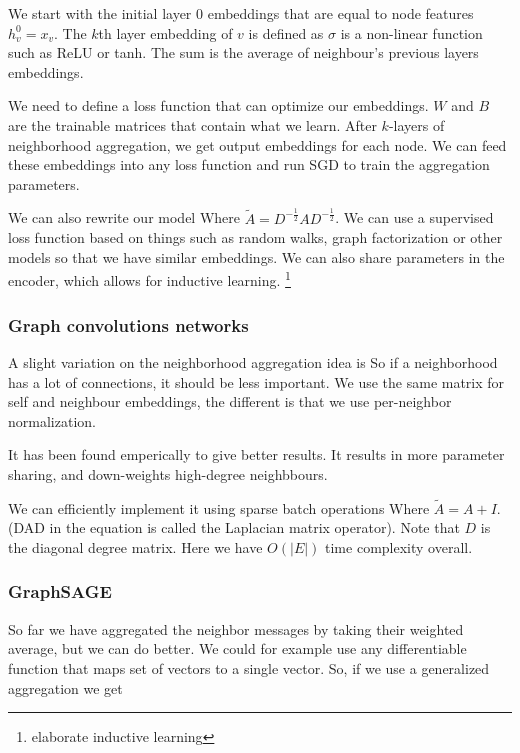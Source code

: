     We start with the initial layer $0$ embeddings that are equal to node features $h_v^0 = x_v$. The $k$th layer embedding of $v$ is defined as 
    $\sigma$ is a non-linear function such as ReLU or tanh. The sum is the average of neighbour's previous layers embeddings. 
    
    We need to define a loss function that can optimize our embeddings. $W$ and $B$ are the trainable matrices that contain what we learn. After $k$-layers of neighborhood aggregation, we get output embeddings for each node. We can feed these embeddings into any loss function and run SGD to train the aggregation parameters. 
    
    We can also rewrite our model
    Where $\tilde{A} = D^{-\frac{1}{2}}AD^{-\frac{1}{2}}$. We can use a supervised loss function based on things such as random walks, graph factorization or other models so that we have similar embeddings. We can also share parameters in the encoder, which allows for inductive learning. \footnote{elaborate inductive learning}
    
\subsubsection{Graph convolutions networks}
    A slight variation on the neighborhood aggregation idea is 
    So if a neighborhood has a lot of connections, it should be less important. We use the same matrix for self and neighbour embeddings, the different is that we use per-neighbor normalization.
    
    It has been found emperically to give better results. It results in more parameter sharing, and down-weights high-degree neighbbours. 
    
    We can efficiently implement it using sparse batch operations
    Where $\tilde{A} = A + I$. (DAD in the equation is called the Laplacian matrix operator). Note that $D$ is the diagonal degree matrix. Here we have $O(|E|)$ time complexity overall. 
    

\subsubsection{GraphSAGE}
    So far we have aggregated the neighbor messages by taking their weighted average, but we can do better. We could for example use any differentiable function that maps set of vectors to a single vector. So, if we use a generalized aggregation we get 
    
